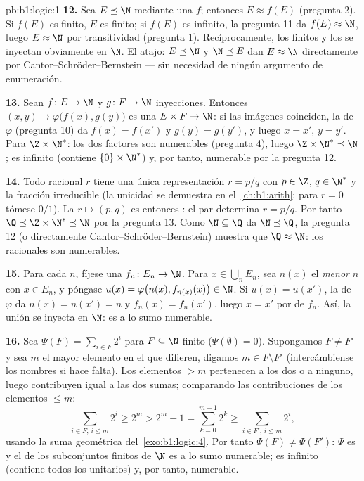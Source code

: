 \begin{solution}{pb:b1:logic:1}
\textbf{12.} Sea $E \preceq \N$ mediante una  $f$; entonces
$E \approx f(E)$ (pregunta 2). Si $f(E)$ es finito, $E$ es finito; si
$f(E)$ es infinito, la pregunta 11 da $f(E) \approx \N$, luego
$E \approx \N$ por transitividad (pregunta 1). Recíprocamente, los
 finitos y los  se inyectan obviamente en
$\N$. El atajo: $E \preceq \N$ y $\N \preceq E$ dan $E \approx \N$
directamente por Cantor--Schröder--Bernstein --- sin necesidad de
ningún argumento de enumeración.

\textbf{13.} Sean $f \colon E \to \N$ y $g \colon F \to \N$
inyecciones. Entonces $(x, y) \mapsto \varphi\bigl(f(x), g(y)\bigr)$ es
una  $E \times F \to \N$: si las imágenes coinciden, la
 de $\varphi$ (pregunta 10) da $f(x) = f(x')$ y
$g(y) = g(y')$, y luego $x = x'$, $y = y'$. Para $\Z \times \N^*$: los
dos factores son numerables (pregunta 4), luego
$\Z \times \N^* \preceq \N$; es infinito (contiene $\{0\} \times \N^*$)
y, por tanto, numerable por la pregunta 12.

\textbf{14.} Todo racional $r$ tiene una única representación
$r = p/q$ con $p \in \Z$, $q \in \N^*$ y la fracción irreducible (la
unicidad se demuestra en el~\cref{ch:b1:arith}; para $r = 0$ tómese
$0/1$). La  $r \mapsto (p, q)$ es entonces : el
par determina $r = p/q$. Por tanto $\Q \preceq \Z \times \N^* \preceq \N$
por la pregunta 13. Como $\N \subseteq \Q$ da $\N \preceq \Q$, la
pregunta 12 (o directamente Cantor--Schröder--Bernstein) muestra que
$\Q \approx \N$: los racionales son numerables.

\textbf{15.} Para cada $n$, fíjese una  $f_n \colon E_n \to \N$.
Para $x \in \bigcup_n E_n$, sea $n(x)$ el \emph{menor} $n$ con
$x \in E_n$, y póngase $u(x) = \varphi\bigl(n(x), f_{n(x)}(x)\bigr)
\in \N$. Si $u(x) = u(x')$, la  de $\varphi$ da $n(x) =
n(x') = n$ y $f_n(x) = f_n(x')$, luego $x = x'$ por  de
$f_n$. Así, la unión se inyecta en $\N$: es a lo sumo numerable.

\textbf{16.} Sea $\Psi(F) = \sum_{i \in F} 2^i$ para $F \subseteq \N$
finito ($\Psi(\emptyset) = 0$). Supongamos $F \neq F'$ y sea $m$ el
mayor elemento en el que difieren, digamos $m \in F \setminus F'$
(intercámbiense los nombres si hace falta). Los elementos $> m$
pertenecen a los dos o a ninguno, luego contribuyen igual a las dos
sumas; comparando las contribuciones de los elementos $\leq m$:
\[
\sum_{i \in F,\, i \leq m} 2^i \geq 2^m
> 2^m - 1 = \sum_{k=0}^{m-1} 2^k
\geq \sum_{i \in F',\, i \leq m} 2^i ,
\]
usando la suma geométrica del~\cref{exo:b1:logic:4}. Por tanto
$\Psi(F) \neq \Psi(F')$: $\Psi$ es  y el  de los
subconjuntos finitos de $\N$ es a lo sumo numerable; es infinito
(contiene todos los  unitarios) y, por tanto, numerable.


\end{solution}
